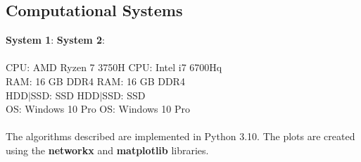 \documentclass[10pt]{article}
\begin{document}
\subsection{Computational Systems} 
\textbf{System 1}:  \hspace{5cm} \textbf{System 2}: \\ \\
CPU: AMD Ryzen 7 3750H \hspace{2.55cm}  CPU: Intel i7 6700Hq \\
RAM: 16 GB DDR4 \hspace{3.7cm} RAM: 16 GB DDR4\\
HDD$|$SSD: SSD \hspace{4.4cm} HDD$|$SSD: SSD \\
OS: Windows 10 Pro  \hspace{3.6cm} OS: Windows 10 Pro \\ \\
The algorithms described are implemented in Python 3.10. The plots are created using the \textbf{networkx} and \textbf{matplotlib} libraries.
\end{document}
